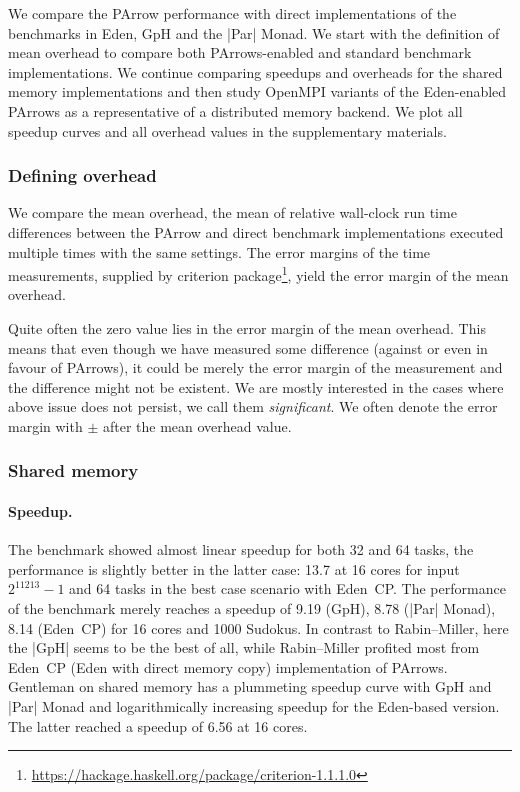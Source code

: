We compare the PArrow performance with direct implementations of the benchmarks in Eden, GpH and the |Par| Monad.
We start with the definition of mean overhead to compare both PArrows-enabled and standard benchmark implementations. We continue comparing speedups and overheads for the shared memory implementations and then study OpenMPI variants of the Eden-enabled PArrows as a representative of a distributed memory backend. We plot all speedup curves and all overhead values in the supplementary materials.

\subsubsection{Defining overhead}

We compare the mean overhead, \ie the mean of relative wall-clock run time differences between the PArrow and direct benchmark implementations executed multiple times with the same settings.
The error margins of the time measurements, supplied by criterion package\footnote{\url{https://hackage.haskell.org/package/criterion-1.1.1.0}}, yield the error margin of the mean overhead. 

Quite often the zero value lies in the error margin of the mean overhead. This means that even though we have measured some difference (against or even in favour of PArrows), it could be merely the error margin of the measurement and the difference might not be existent. We are mostly interested in the cases where above issue does not persist, we call them \emph{significant}. We often denote the error margin with $\pm$ after the mean overhead value.

\subsubsection{Shared memory}

\paragraph{Speedup.}
The \rmtest benchmark showed almost linear speedup for both 32 and 64 tasks, the performance is slightly better in the latter case: 13.7 at 16 cores for input $2^{11213}-1$ and 64 tasks in the best case scenario with Eden~CP. The performance of the \sudokutest benchmark merely reaches a speedup of 9.19 (GpH), 8.78 (|Par| Monad), 8.14 (Eden~CP) for 16 cores and 1000 Sudokus. In contrast to Rabin--Miller, here the |GpH| seems to be the best of all, while Rabin--Miller profited most from Eden~CP (\ie Eden with direct memory copy) implementation of PArrows. Gentleman on shared memory has a plummeting speedup curve with GpH and |Par| Monad and logarithmically increasing speedup for the Eden-based version. The latter reached a speedup of 6.56 at 16 cores.

